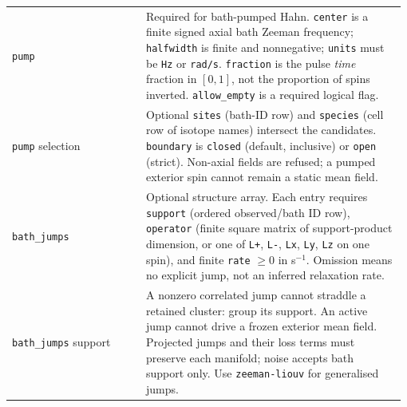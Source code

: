 \documentclass[11pt,a4paper]{article}
\newcommand{\code}[1]{\texttt{#1}}
\begin{document}
\begin{longtable}{@{}>{\raggedright\arraybackslash}p{0.335\linewidth}@{\hspace{0.025\linewidth}}>{\raggedright\arraybackslash}p{0.64\linewidth}@{}}
\code{pump} & Required for bath-pumped Hahn. \code{center} is a finite signed axial bath Zeeman frequency; \code{halfwidth} is finite and nonnegative; \code{units} must be \code{Hz} or \code{rad/s}. \code{fraction} is the pulse \emph{time} fraction in $[0,1]$, not the proportion of spins inverted. \code{allow\_empty} is a required logical flag.\\
\code{pump} selection & Optional \code{sites} (bath-ID row) and \code{species} (cell row of isotope names) intersect the candidates. \code{boundary} is \code{closed} (default, inclusive) or \code{open} (strict). Non-axial fields are refused; a pumped exterior spin cannot remain a static mean field.\\
\code{bath\_jumps} & Optional structure array. Each entry requires \code{support} (ordered observed/bath ID row), \code{operator} (finite square matrix of support-product dimension, or one of \code{L+}, \code{L-}, \code{Lx}, \code{Ly}, \code{Lz} on one spin), and finite \code{rate} $\ge0$ in s$^{-1}$. Omission means no explicit jump, not an inferred relaxation rate.\\
\code{bath\_jumps} support & A nonzero correlated jump cannot straddle a retained cluster: group its support. An active jump cannot drive a frozen exterior mean field. Projected jumps and their loss terms must preserve each manifold; noise accepts bath support only. Use \code{zeeman-liouv} for generalised jumps.\\
\end{longtable}
\endgroup
\end{document}
